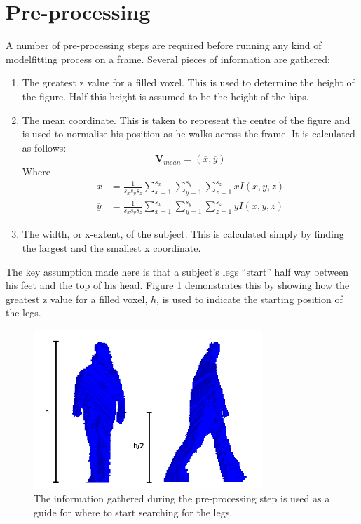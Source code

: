 \section{Pre-processing}\label{LocatingCenter}

A number of pre-processing steps are required before running any kind of modelfitting process on a frame.
Several pieces of information are gathered:

\begin{enumerate}
	\item The greatest z value for a filled voxel.
		This is used to determine the height of the figure.
		Half this height is assumed to be the height of the hips.
	\item The mean coordinate.
		This is taken to represent the centre of the figure and is used to normalise his position as he walks across the frame.
		It is calculated as follows:
		\begin{equation}
			\mathbf{V}_{mean} = (\overline{x}, \overline{y})
		\end{equation}
		Where
		\begin{align}
			\overline{x} &= \frac{1}{s_x s_y s_z} \sum_{x=1}^{s_x} \sum_{y=1}^{s_y} \sum_{z=1}^{s_z} x I(x,y,z) \\
			\overline{y} &= \frac{1}{s_x s_y s_z} \sum_{x=1}^{s_x} \sum_{y=1}^{s_y} \sum_{z=1}^{s_z} y I(x,y,z)
		\end{align}
	\item The width, or x-extent, of the subject.
		This is calculated simply by finding the largest and the smallest x coordinate.
\end{enumerate}

The key assumption made here is that a subject's legs ``start'' half way between his feet and the top of his head.
Figure \ref{Preprocessing} demonstrates this by showing how the greatest z value for a filled voxel, $h$, is used to
indicate the starting position of the legs.

\begin{figure}[b]
	\centering
	\includegraphics[height=6cm]{preprocessing.png}
	\caption{The information gathered during the pre-processing step is used as a guide for where to start searching for the legs.}
	\label{Preprocessing}
\end{figure}
